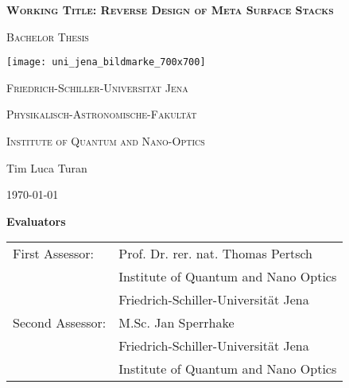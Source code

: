 \begin{titlepage}
	\centering

	{\scshape\Large \textbf{Working Title: Reverse Design of Meta Surface Stacks} \par}
	\vspace{1cm}
	{\scshape\Large Bachelor Thesis \par}
	\vspace{1.5cm}
	\texttt{[image: uni\_jena\_bildmarke\_700x700]}\par
	{\huge\bfseries \par}
	\vspace{10cm}
	{\scshape\large Friedrich-Schiller-Universität Jena\par}
	{\scshape\large Physikalisch-Astronomische-Fakultät\par}
	{\scshape\large Institute of Quantum and Nano-Optics\par}
	\vfill
	{\Large Tim Luca Turan}

	\vfill

	{\large \today\par}
\end{titlepage}

\thispagestyle{empty}
\vspace*{\fill}
\textbf{\Large Evaluators}\\[1.5cm]

\begin{tabular}{ll}
First Assessor: & Prof. Dr. rer. nat. Thomas Pertsch\\
 & Institute of Quantum and Nano Optics \\
 & Friedrich-Schiller-Universität Jena \\
Second Assessor: & M.Sc. Jan Sperrhake \\
 & Friedrich-Schiller-Universität Jena \\
 & Institute of Quantum and Nano Optics \\
\end{tabular}

